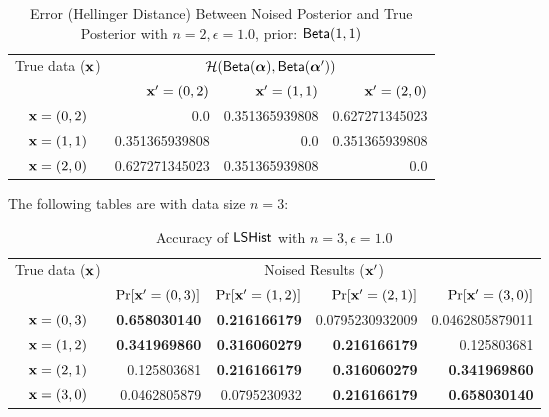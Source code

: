 \documentclass{article}
\begin{document}
\begin{table}[htbp]
\vspace{-0.8cm}
	\scriptsize
	\centering
	\caption{Error (Hellinger Distance) Between Noised Posterior and True Posterior with $n = 2, \epsilon = 1.0$, prior: $\mathsf{Beta}(1,1)$}
	\label{tab_n2error}
\vspace{-0.2cm}
\begin{tabular}{|c||r|r|r|}
	\hline
	\multirow{2}{*}{True data ($\textbf{x}$)}
								& \multicolumn{3}{c|}{$\mathcal{H}(\mathsf{Beta}(\boldsymbol{\alpha}), \mathsf{Beta}(\boldsymbol{\alpha}'))$}
								\\ \cline{2-4}
	                      		& $\textbf{x}' = (0, 2)$
	                      		& $\textbf{x}' = (1, 1)$
	                      		& $\textbf{x}' = (2, 0)$
	                      		\\  \hline \hline
	$\textbf{x} = (0,2)$          & 0.0	
								& 0.351365939808
								& 0.627271345023 
								\\  \hline
	$\textbf{x} = (1,1)$          & 0.351365939808
								& 0.0			
								& 0.351365939808
								\\  \hline
	$\textbf{x} = (2,0)$          & 0.627271345023
								& 0.351365939808
								& 0.0
								\\  \hline
\end{tabular}
\end{table}


\clearpage
The following tables are with data size $n = 3:$



\begin{table}[htbp]
	\footnotesize
	\centering
	\caption{Accuracy of $\mathsf{LSHist}$ with $n = 3, \epsilon = 1.0$}
	\label{tab_n3eps1prob}
\begin{tabular}{|c||r|r|r|r|}
	\hline
	\multirow{2}{*}{True data ($\textbf{x}$)}
								& \multicolumn{4}{c|}{Noised Results ($\textbf{x}'$)}  
								\\ \cline{2-5}
	                      		&  $\Pr[\textbf{x}' = (0, 3)]$  	
	                      		&  $\Pr[\textbf{x}' = (1, 2)]$ 	
	                      		&  $\Pr[\textbf{x}' = (2, 1)]$ 	
	                      		&  $\Pr[\textbf{x}' = (3, 0)]$ 	
	                      		\\  \hline
	                      		\hline
	$\textbf{x} = (0,3)$          & {\bf 0.658030140}
								& {\bf 0.216166179}
								&  0.0795230932009
								&  0.0462805879011
								\\  \hline
	$\textbf{x} = (1,2)$          & {\bf 0.341969860}
								& {\bf 0.316060279}
								& {\bf 0.216166179}
								&  0.125803681
								\\  \hline
	$\textbf{x} = (2,1)$          & 0.125803681
								& {\bf 0.216166179}
								& {\bf 0.316060279}
								& {\bf 0.341969860}
								\\  \hline
	$\textbf{x} = (3,0)$          & 0.0462805879
								& 0.0795230932	
								& {\bf 0.216166179}
								& {\bf 0.658030140}
								\\  \hline
\end{tabular}
\end{table}
\end{document}
